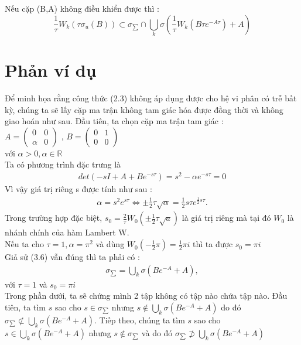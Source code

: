  \begin{hq}
 Nếu cặp (B,A) không điều khiển được thì :
 $$ \frac{1}{\tau}W_{k}(\tau\sigma_{u}(B)) \subset \sigma_{\sum} \cap \displaystyle \bigcup_{k}\sigma(\frac{1}{\tau}W_{k}(B\tau e^{-A\tau})+A) $$
 \end{hq}
 \section{Phản ví dụ}
 Để minh họa rằng công thức (2.3) không áp dụng được cho hệ vi phân có trễ bất kỳ, chúng ta sẽ lấy cặp ma trận không tam giác hóa được đồng thời và không giao hoán như sau.
 Đầu tiên, ta chọn cặp ma trận tam giác  :  \\
 $A = \begin{pmatrix}
 0 & 0 \\
 \alpha & 0
 \end{pmatrix}$ , $B = \begin{pmatrix}
 0 & 1 \\
 0 & 0
 \end{pmatrix}$ \\
 với $\alpha > 0, \alpha \in \mathbb{R}$ \\
 Ta có phương trình đặc trưng là
 \begin{align}
 det(-sI + A + Be^{-s\tau}) = s^{2} - \alpha e^{-s\tau} = 0
 \end{align}
 Vì vậy giá trị riêng s được tính như sau :
 \begin{align}
 \alpha = s^{2}e^{s\tau} \Leftrightarrow \pm\frac{1}{2}\tau \sqrt{\alpha} = \frac{1}{2}s\tau e^{\frac{1}{2}s\tau}.
 \end{align}
 Trong trường hợp đặc biệt, $s_{0} = \frac{2}{\tau}W_{0}(\pm\frac{1}{2}\tau\sqrt{a})$ là giá trị riêng mà tại đó $W_{0}$ là nhánh chính của hàm Lambert W. \\
 Nếu ta cho $\tau = 1, \alpha = \pi^{2}$ và dùng $W_{0}(-\frac{1}{2}\pi) = \frac{1}{2}\pi i$ thì ta được $s_{0} = \pi i$\\
 Giả sử (3.6) vẫn đúng thì ta phải có :
 \begin{align}
 \sigma_{\sum} = \displaystyle \bigcup_{k}\sigma(Be^{-A}+A) ,
 \end{align}
 với $\tau = 1$ và $s_{0} = \pi i$ \\
 Trong phần dưới, ta sẽ chứng mình 2 tập không có tập nào chứa tập nào. Đầu tiên, ta tìm $s$ sao cho $s \in \sigma_{\sum}$ nhưng $s \notin \displaystyle \bigcup_{k}\sigma(Be^{-A}+A)$ do đó $\sigma_{\sum} \not\subset \displaystyle \bigcup_{k}\sigma(Be^{-A}+A)$. Tiếp theo, chúng ta tìm $s$ sao cho $s \in \displaystyle \bigcup_{k}\sigma(Be^{-A}+A)$ nhưng $s \notin \sigma_{\sum}$ và do đó $\sigma_{\sum} \not\supset \displaystyle \bigcup_{k}\sigma(Be^{-A}+A)$ \\
